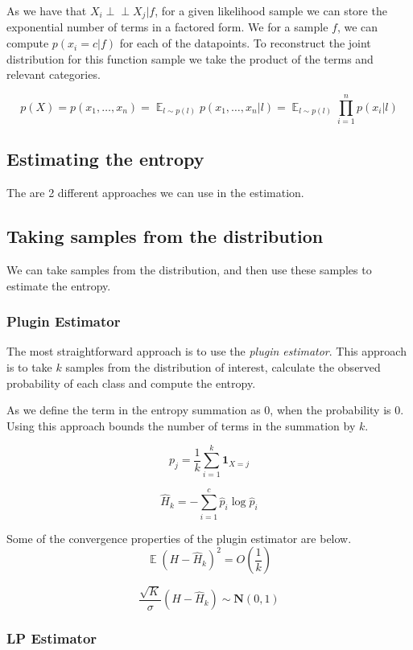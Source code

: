 \documentclass[12pt, a4paper]{report}
\theoremstyle{definition}
\theoremstyle{definition}
\theoremstyle{definition}
\DeclareMathOperator{\E}{\mathbb{E}}
\begin{document}
As we have that $ X_i \perp\!\!\!\perp X_j | f$, for a given likelihood sample we can store the exponential number of terms in a factored form. We for a sample $f$, we can compute $p(x_i = c | f)$ for each of the datapoints. To reconstruct the joint distribution for this function sample we take the product of the terms and relevant categories.


$$ p(X) = p(x_1, \ldots, x_n) = \E_{l \sim p(l)}  p(x_1, \ldots, x_n | l) = \E_{l \sim p(l)} \prod_{i=1}^n  p(x_i| l)$$

\subsection{Estimating the entropy}

The are 2 different approaches we can use in the estimation.

\subsection{Taking samples from the distribution}

We can take samples from the distribution, and then use these samples to estimate the entropy.



\subsubsection{Plugin Estimator}
The most straightforward approach is to use the \textit{plugin estimator}. This approach is to take $k$ samples from the distribution of interest, calculate the observed probability of each class and compute the entropy.

As we define the term in the entropy summation as $0$, when the probability is $0$. Using this approach bounds the number of terms in the summation by $k$.

$$p_j = \frac{1}{k} \sum_{i=1}^k \mathbf{1}_{X = j} $$

$$\hat{H}_k = - \sum_{i=1}^{c} \hat{p}_i \log{\hat{p}_i}$$


Some of the convergence properties of the plugin estimator are below.
$$\E \left(H - \hat{H}_k \right)^2 = O \left ( \frac{1}{k} \right) $$

$$ \frac{\sqrt{K}}{\sigma} \left(H - \hat{H}_k \right) \sim \mathbf{N} \left(0, 1 \right) $$



\subsubsection{LP Estimator}
\end{document}
